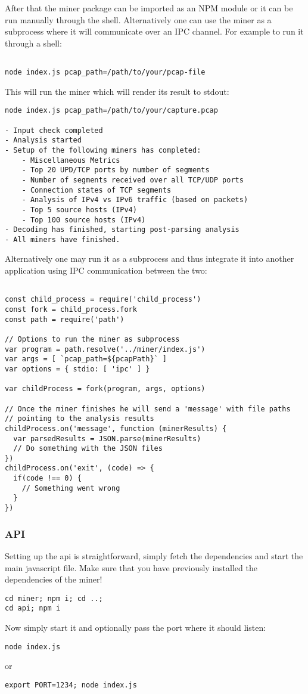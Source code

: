 After that the miner package can be imported as an NPM module or it can be run manually through the shell. Alternatively one can use the miner as a subprocess where it will communicate over an IPC channel.
For example to run it through a shell:
\begin{lstlisting}

node index.js pcap_path=/path/to/your/pcap-file
\end{lstlisting}{}
This will run the miner which will render its result to stdout:
\begin{lstlisting}
node index.js pcap_path=/path/to/your/capture.pcap

- Input check completed
- Analysis started
- Setup of the following miners has completed:
	- Miscellaneous Metrics
	- Top 20 UPD/TCP ports by number of segments
	- Number of segments received over all TCP/UDP ports
	- Connection states of TCP segments
	- Analysis of IPv4 vs IPv6 traffic (based on packets)
	- Top 5 source hosts (IPv4)
	- Top 100 source hosts (IPv4)
- Decoding has finished, starting post-parsing analysis
- All miners have finished.

\end{lstlisting}
Alternatively one may run it as a subprocess and thus integrate it into another application using IPC communication between the two:
\begin{lstlisting}

const child_process = require('child_process')
const fork = child_process.fork
const path = require('path')

// Options to run the miner as subprocess
var program = path.resolve('../miner/index.js')
var args = [ `pcap_path=${pcapPath}` ]
var options = { stdio: [ 'ipc' ] }

var childProcess = fork(program, args, options)

// Once the miner finishes he will send a 'message' with file paths
// pointing to the analysis results
childProcess.on('message', function (minerResults) {
  var parsedResults = JSON.parse(minerResults)
  // Do something with the JSON files
})
childProcess.on('exit', (code) => {
  if(code !== 0) {
    // Something went wrong
  }
})
\end{lstlisting}{}

\subsubsection{API}
Setting up the api is straightforward, simply fetch the dependencies and start the main javascript file. Make sure that you have previously installed the dependencies of the miner!
\begin{lstlisting}
cd miner; npm i; cd ..;
cd api; npm i
\end{lstlisting}{}
Now simply start it and optionally pass the port where it should listen:
\begin{lstlisting}
node index.js
\end{lstlisting}{}
or
\begin{lstlisting}
export PORT=1234; node index.js
\end{lstlisting}{}


